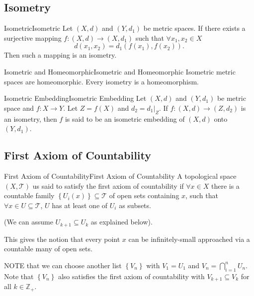 \documentclass[../main.tex]{subfiles}
\begin{document}
\subsection{Isometry}
\begin{definition}{Isometric}{Isometric}
Let $(X,d)$ and $(Y,d_1)$ be metric spaces. If there exists a surjective mapping $f: (X,d) \rightarrow (X,d_1)$ such that $\forall x_1,x_2\in X$
\begin{equation}
d(x_1,x_2) = d_1(f(x_1),f(x_2)).
\end{equation}
Then such a mapping is an isometry.
\end{definition}

\begin{proposition}{Isometric and Homeomorphic}{Isometric and Homeomorphic}
Isometric metric spaces are homeomorphic. Every isometry is a homeomorphism.
\end{proposition}

\begin{definition}{Isometric Embedding}{Isometric Embedding}
Let $(X,d)$ and $(Y,d_1)$ be metric space and $f: X \rightarrow Y$. Let $Z = f(X)$ and $d_2=d_1|_Z$. If $f: (X,d) \rightarrow (Z,d_2)$ is an isometry, then $f$ is said to be an isometric embedding of $(X,d)$ onto $(Y,d_1)$.
\end{definition}

\subsection{First Axiom of Countability}
\begin{definition}{First Axiom of Countability}{First Axiom of Countability}
A  topological space $(X,\mathcal{T})$ us said to satisfy the first axiom of countability if $\forall x\in X$ there is a countable family $\left\{ U_i(x) \right\} \subseteq \mathcal{T}$ of open sets containing $x$, such that $\forall x\in U \subseteq \mathcal{T}$, $U$ has at least one of $U_i$ as subsets.

(We can assume $U_{k+1} \subseteq U_k$ as explained below).
\end{definition}

\begin{remark}
This gives the notion that every point $x$ can be infinitely-small approached via a countable many of open sets.

NOTE that we can choose another list $\left\{ V_n \right\}$ with $V_1=U_1$ and $V_n = \bigcap_{i=1}^{n} U_n$. Note that $\left\{ V_n \right\}$ also satisfies the first axiom of countability with $V_{k+1} \subseteq V_k$ for all $k\in \mathbb{Z}_+$.
\end{remark}
\end{document}
